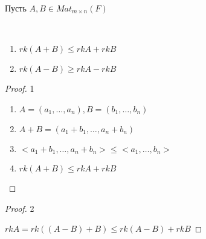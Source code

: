 \begin{lemma}
    
    Пусть $A, B \in Mat_{m \times n}(F)$

    \begin{properties}~
        
        \begin{enumerate}
            \item $rk(A + B) \leq rk A + rk B$
            \item $rk(A - B) \geq rk A - rk B$
        \end{enumerate}

    \end{properties}

    \bigskip

    \begin{proof} 1~

        \begin{enumerate}
            \item $A = \left(a_1, \dots, a_n\right), B = \left(b_1, \dots, b_n\right)$
            \item $A + B = \left(a_1 + b_1, \dots, a_n + b_n\right)$
            \item $<a_1 + b_1, \dots, a_n + b_n> \leq <a_1, \dots, b_n>$
            \item $rk(A + B) \leq rk A + rk B$
        \end{enumerate}
        
    \end{proof}

    \bigskip

    \begin{proof} 2~

        $rk A = rk ((A - B) + B) \leq rk (A - B) + rk B$
        
    \end{proof}

    \bigskip

    \begin{comment}
    
        Эти неравенства достигаются (например при $B = 0$)

    \end{comment}

\end{lemma}


\bigskip


